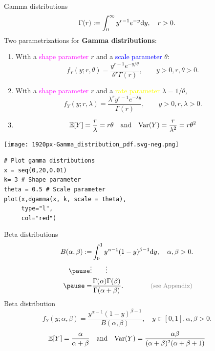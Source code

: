 \begin{frame}{Gamma distributions}
\[
\Gamma(r) := \int_0^\infty y^{r-1} e^{-y} \mathrm{d} y,\quad r>0.
\] \pause
\vfill
Two parametrizations for {\bf Gamma distributions}:
\vfill
\begin{enumerate}
  \item With a \textcolor{magenta}{shape parameter} $r$ and a \textcolor{blue}{scale parameter} $\theta$:
 \[
 f_Y(y;r,\theta) =  \frac{y^{r-1} e^{-y/\theta}}{\theta^r \Gamma(r)},
 \qquad y>0, r,\theta>0.
 \]
 \vfill
 \item With a \textcolor{magenta}{shape parameter} $r$ and a \textcolor{yellow}{rate parameter} $\lambda=1/\theta$,
 \[
 f_Y(y;r,\lambda) = \frac{\lambda^r y^{r-1} e^{-\lambda y}}{\Gamma(r)},
 \qquad y>0, r,\lambda>0.
 \]
 \vfill
 \item[]
 \[
 \mathbb{E}[Y] =  \frac{r}{\lambda} = r\theta \quad \text{and}\quad
 \text{Var}(Y) = \frac{r}{\lambda^2} = r\theta^2
 \]
\end{enumerate}

\end{frame}
\begin{frame}[fragile]

 \begin{center}
  \texttt{[image: 1920px-Gamma\_distribution\_pdf.svg-neg.png]}
  \begin{minipage}{0.4\textwidth}
  \begin{lstlisting}
# Plot gamma distributions
x = seq(0,20,0.01)
k= 3 # Shape parameter
theta = 0.5 # Scale parameter
plot(x,dgamma(x, k, scale = theta),
     type="l",
     col="red")
  \end{lstlisting}
  \end{minipage}
 \end{center}

\end{frame}
\begin{frame}{Beta distributions}
 \begin{align*}
 B(\alpha,\beta) := & \int_0^1 y^{\alpha-1}(1-y)^{\beta-1}\ud y, \quad \alpha,\beta >0. \\ \pause
 \vdots& \qquad \vdots \\ \pause
 =& \frac{\Gamma(\alpha)\Gamma(\beta)}{\Gamma(\alpha+\beta)}. \qquad\qquad  \text{\textcolor{gray}{\small (see Appendix)}}
 \end{align*}
\vfill \pause
Beta distribution
\[
f_Y(y;\alpha,\beta) = \frac{y^{\alpha-1}(1-y)^{\beta-1}}{B(\alpha,\beta)}, \quad y\in[0,1], \alpha,\beta>0.
\]
\vfill \pause
\[
\mathbb{E}[Y] = \frac{\alpha}{\alpha+\beta}\quad\text{and}\quad
\text{Var}(Y) = \frac{\alpha\beta}{(\alpha+\beta)^2(\alpha+\beta+1)}
\]
\end{frame}
